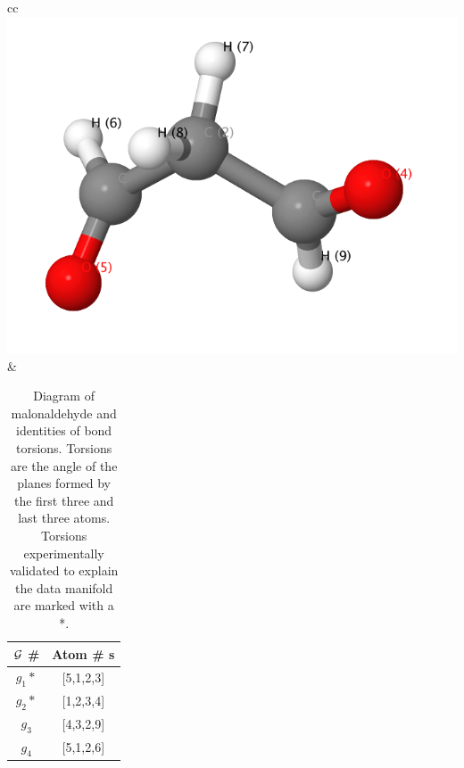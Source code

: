 

\begin{table}[hbt!]
\begin{tabular}{cc}
\includegraphics[scale=0.25,valign=m]{../Figures/malonaldehyde/malonaldehyde.png}
&
\begin{tabular}{ | c | c | } 
\hline
${\cal G}$ \# & Atom \# s \\
\hline
$g_1*$ & [5,1,2,3]\\
\hline
$g_2*$ &[1,2,3,4]\\
\hline
$g_3$ &[4,3,2,9]\\
\hline
$g_4$ &[5,1,2,6] \\
\hline
\end{tabular}
\end{tabular}
\caption{Diagram of malonaldehyde and identities of bond torsions.  Torsions are the angle of the planes formed by the first three and last three atoms. Torsions experimentally validated to explain the data manifold are marked with a *.}
\label{figtab:mal}
\end{table}

